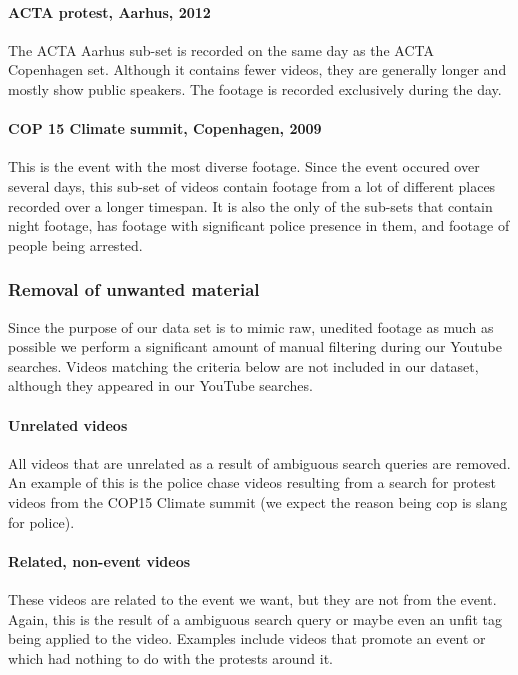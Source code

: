 \paragraph{ACTA protest, Aarhus, 2012}
%
The ACTA Aarhus sub-set is recorded on the same day as the ACTA Copenhagen set. Although it contains fewer videos, they are generally longer and mostly show public speakers. The footage is recorded exclusively during the day.
%
\paragraph{COP 15 Climate summit, Copenhagen, 2009}
%
This is the event with the most diverse footage. Since the event occured over several days, this sub-set of videos contain footage from a lot of different places recorded over a longer timespan. It is also the only of the sub-sets that contain night footage, has footage with significant police presence in them, and footage of people being arrested.
%
\subsubsection{Removal of unwanted material}
%
Since the purpose of our data set is to mimic raw, unedited footage as much as possible we perform a significant amount of manual filtering during our Youtube searches. Videos matching the criteria below are not included in our dataset, although they appeared in our YouTube searches.
%
\paragraph{Unrelated videos}
%
All videos that are unrelated as a result of ambiguous search queries are removed. An example of this is the police chase videos resulting from a search for protest videos from the COP15 Climate summit (we expect the reason being cop is slang for police).
%
\paragraph{Related, non-event videos}
%
These videos are related to the event we want, but they are not from the event. Again, this is the result of a ambiguous search query or maybe even an unfit tag being applied to the video. Examples include videos that promote an event or which had nothing to do with the protests around it.
%
